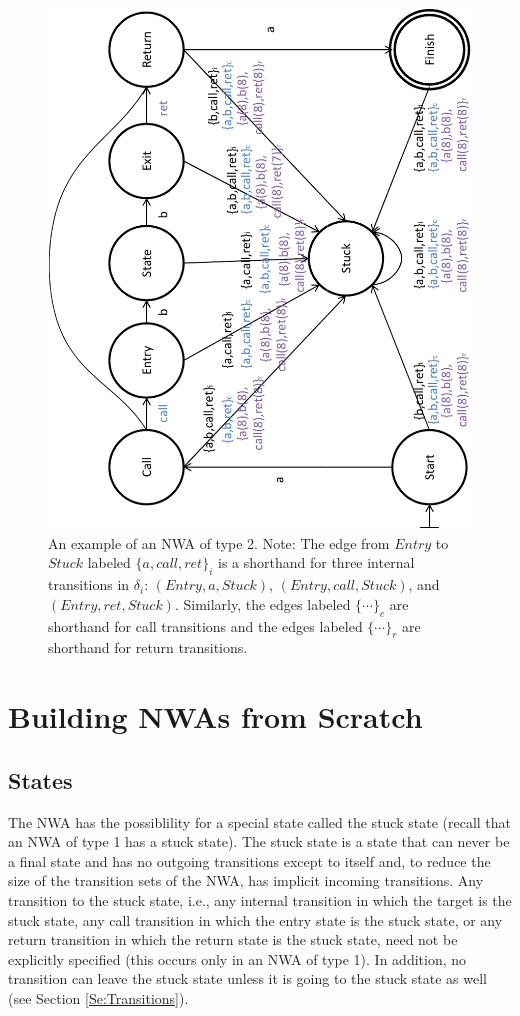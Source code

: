 \documentclass{llncs}
\begin{document}
\begin{figure}[htb]
  \centering
    \includegraphics[width=12cm]{Figures/Figure2}
  \caption{An example of an NWA of type 2.  Note: The edge from $Entry$ to
    $Stuck$ labeled $\{a,call,ret\}_i$ is a shorthand for three internal
    transitions in $\delta_i$: $(Entry,a,Stuck)$, $(Entry,call,Stuck)$, and
    $(Entry,ret,Stuck)$.  Similarly, the edges labeled $\{\cdots\}_c$ are
    shorthand for call transitions and the edges labeled $\{\cdots\}_r$ are
    shorthand for return transitions.}
  \label{Fig:Example2}
\end{figure}


\section{Building NWAs from Scratch}
\label{Se:Scratch}

\subsection{States}
\label{Se:States}

The NWA has the possiblility for a special state called the stuck state
(recall that an NWA of type 1 has a stuck state).  The stuck state is a state
that can never be a final state and has no outgoing transitions except to
itself and, to reduce the size of the transition sets of the NWA, has
implicit incoming transitions.  Any transition to the stuck state, i.e., any
internal transition in which the target is the stuck state, any call
transition in which the entry state is the stuck state, or any return
transition in which the return state is the stuck state, need not be
explicitly specified (this occurs only in an NWA of type 1).  In addition, no
transition can leave the stuck state unless it is going to the stuck state as
well (see Section \ref{Se:Transitions}). \\
\end{document}
